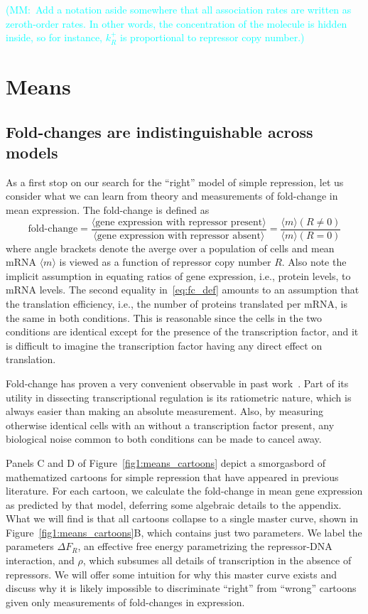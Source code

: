 \documentclass[12pt]{article}%
\newcommand{\mmnote}[1]{\textcolor{cyan}{(MM:~#1)}}
\newcommand{\fig}[1]{Figure~\ref{#1}}
\begin{document}
\mmnote{Add a notation aside somewhere that all association rates are written as zeroth-order rates. In other words, the concentration of the molecule is hidden inside, so for instance, $k_R^+$ is proportional to repressor copy number.}

\section{Means}
\subsection{Fold-changes are indistinguishable across models}
As a first stop on our search for the ``right'' model of simple
repression, let us consider what we can learn from theory and
measurements of fold-change in mean expression. The fold-change is defined as
\begin{equation}
\text{fold-change}
= \frac{\langle \text{gene expression with repressor present} \rangle}
        {\langle \text{gene expression with repressor absent} \rangle}
= \frac{\langle m\rangle(R\ne 0)}{\langle m\rangle(R = 0)}
\label{eq:fc_def}
\end{equation}
where angle brackets denote the averge over a population of cells
and mean mRNA $\langle m\rangle$ is viewed as a function of
repressor copy number $R$.
Also note the implicit assumption in equating ratios of gene
expression, i.e., protein levels, to mRNA levels. The second
equality in~\ref{eq:fc_def} amounts to an assumption that the
translation efficiency, i.e., the number of proteins translated
per mRNA, is the same in both conditions.
This is reasonable since the cells in the two conditions are
identical except for the presence of the transcription factor,
and it is difficult to imagine the transcription factor having
any direct effect on translation.

Fold-change has proven a very convenient observable in past
work~\cite{Garcia2011a, Razo-Mejia2018, Chure2019}.
Part of its utility in dissecting transcriptional regulation is
its ratiometric nature, which is always easier than making an
absolute measurement. Also, by measuring otherwise identical cells
with an without a transcription factor present, any biological
noise common to both conditions can be made to cancel away.

Panels C and D of \fig{fig1:means_cartoons} depict a smorgasbord
of mathematized cartoons for simple repression that have appeared
in previous literature. For each cartoon, we calculate the
fold-change in mean gene expression as predicted by that model,
deferring some algebraic details to the appendix.
What we will find is that all cartoons collapse to a single
master curve, shown in \fig{fig1:means_cartoons}B, which contains
just two parameters. We label the parameters $\Delta F_R$, an
effective free energy parametrizing the repressor-DNA
interaction, and $\rho$, which subsumes all details of
transcription in the absence of repressors.
We will offer some intuition for why this master curve exists and discuss
why it is likely impossible to discriminate ``right'' from ``wrong''
cartoons given only measurements of fold-changes in expression.
\end{document}

